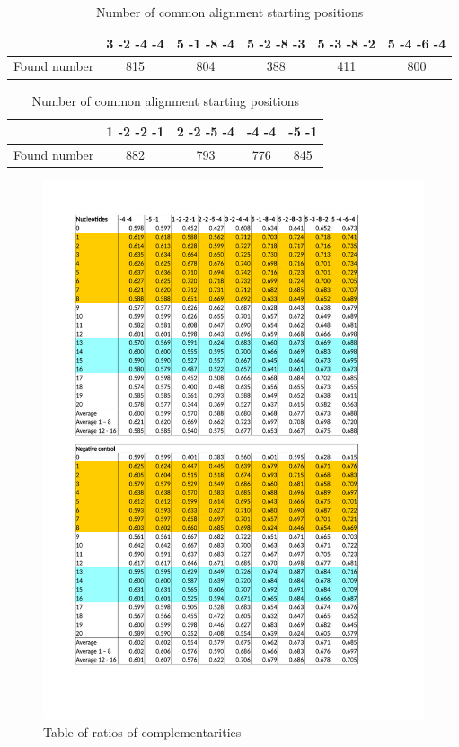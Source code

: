 \documentclass[12pt]{article}
\begin{document}
\begin{table}
\label{tab:positions}
\caption{Number of common alignment starting positions}
\vspace{0.3cm}
\begin{tabular}{c||c|c|c|c|c} 
& 3 -2 -4 -4 & 5 -1 -8 -4 & 5 -2 -8 -3 & 5 -3 -8 -2 & 5 -4 -6 -4  \\
\hline\hline
Found number & 815 & 804 & 388 & 411 & 800\\
\hline
\end{tabular}
\vspace{0.5cm}

\begin{tabular}{c||c|c|c|c}
& 1 -2 -2 -1 & 2 -2 -5 -4 & -4 -4 & -5 -1 \\
\hline\hline
Found number & 882 & 793 & 776 & 845  \\
\hline
\end{tabular}
\end{table}


\begin{figure}
\label{table:ratios}
\vspace{-3cm}
\includegraphics[scale=0.8]{results/ratio_table.pdf}
\vspace{-2.8cm}
\caption{Table of ratios of complementarities}
\end{figure}
\end{document}

